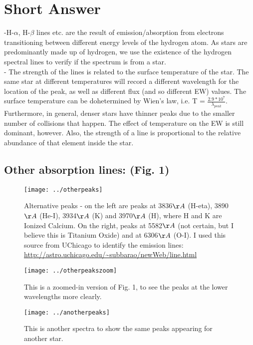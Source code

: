 \documentclass[12pt]{article}
\begin{document}
\section{Short Answer}

-H-$\alpha$, H-$\beta$ lines etc. are the result of emission/absorption from electrons transitioning between different energy levels of the hydrogen atom. As stars are predominantly made up of hydrogen, we use the existence of the hydrogen spectral lines to verify if the spectrum is from a star. \\
- The strength of the lines is related to the surface temperature of the star. The same star at different temperatures will record a different wavelength for the location of the peak, as well as different flux (and so different EW) values. The surface temperature can be dohetermined by Wien's law, i.e.
T = $ \frac{2.9*10^7}{\lambda_{peak}} $. Furthermore, in general, denser stars have thinner peaks due to the smaller number of collisions that happen. The effect of temperature on the EW is still dominant, however. Also, the strength of a line is proportional to the relative abundance of that element inside the star.

\subsection{ Other absorption lines: (Fig. 1) }
\begin{figure}
\texttt{[image: ../otherpeaks]}
\caption{Alternative peaks - on the left are peaks at 3836$\AA$ (H-eta), 3890$\AA$ (He-I), 3934$\AA$ (K) and 3970$\AA$ (H), where H and K are Ionized Calcium.   On the right, peaks at 5582$\AA$ (not certain, but I believe this is Titanium Oxide) and at 6306$\AA$ (O-I). I used this source from UChicago to identify the emission lines: \url{http://astro.uchicago.edu/~subbarao/newWeb/line.html}}
\end{figure}
\begin{figure}
\texttt{[image: ../otherpeakszoom]}\\
\caption{This is a zoomed-in version of Fig. 1, to see the peaks at the lower wavelengths more clearly.}
\end{figure}
\begin{figure}
\texttt{[image: ../anotherpeaks]}\\
\caption{This is another spectra to show the same peaks appearing for another star.}
\end{figure}
\end{document}
